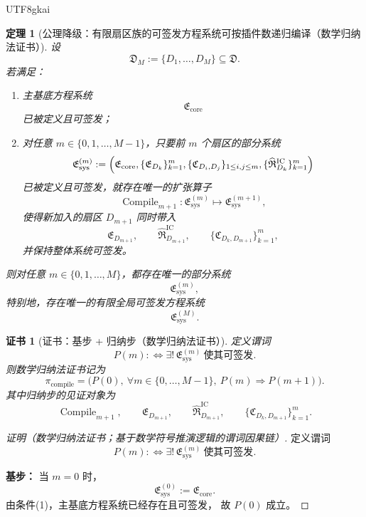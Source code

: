 \documentclass[12pt]{article}
\newtheorem{theorem}{定理}[section]
\newtheorem{Certificate}{证书}[section]
\begin{document}
\begin{CJK*}{UTF8}{gkai}
\begin{theorem}[公理降级：有限扇区族的可签发方程系统可按插件数递归编译（数学归纳法证书）]
\label{thm:tex37-ch11-induction}
设
\[
  \mathfrak D_M
  :=
  \{D_1,\dots,D_M\}
  \subseteq \mathfrak D.
\]
若满足：
\begin{enumerate}
  \item 主基底方程系统
  \[
    \mathfrak E_{\mathrm{core}}
  \]
  已被定义且可签发；
  \item 对任意 $m\in\{0,1,\dots,M-1\}$，只要前 $m$ 个扇区的部分系统
  \[
    \mathfrak E_{\mathrm{sys}}^{(m)}
    :=
    \Bigl(
      \mathfrak E_{\mathrm{core}},
      \{\mathfrak E_{D_k}\}_{k=1}^{m},
      \{\mathfrak C_{D_i,D_j}\}_{1\le i,j\le m},
      \{\widehat{\mathfrak R}_{D_k}^{\mathrm{IC}}\}_{k=1}^{m}
    \Bigr)
  \]
  已被定义且可签发，就存在唯一的扩张算子
  \[
    \operatorname{Compile}_{m+1}:
    \mathfrak E_{\mathrm{sys}}^{(m)}
    \longmapsto
    \mathfrak E_{\mathrm{sys}}^{(m+1)},
  \]
  使得新加入的扇区 $D_{m+1}$ 同时带入
  \[
    \mathfrak E_{D_{m+1}},
    \qquad
    \widehat{\mathfrak R}_{D_{m+1}}^{\mathrm{IC}},
    \qquad
    \{\mathfrak C_{D_k,D_{m+1}}\}_{k=1}^{m},
  \]
  并保持整体系统可签发。
\end{enumerate}
则对任意 $m\in\{0,1,\dots,M\}$，都存在唯一的部分系统
\[
  \mathfrak E_{\mathrm{sys}}^{(m)},
\]
特别地，存在唯一的有限全局可签发方程系统
\[
  \mathfrak E_{\mathrm{sys}}^{(M)}.
\]
\end{theorem}

\begin{Certificate}[证书：基步 + 归纳步（数学归纳法证书）]
\label{cert:tex37-ch11-induction}
定义谓词
\[
  P(m)
  :
  \Longleftrightarrow
  \exists!\,\mathfrak E_{\mathrm{sys}}^{(m)}
  \ \text{使其可签发}.
\]
则数学归纳法证书记为
\[
  \pi_{\mathrm{compile}}
  =
  \bigl(
    P(0),\
    \forall m\in\{0,\dots,M-1\},\ P(m)\Rightarrow P(m+1)
  \bigr).
\]
其中归纳步的见证对象为
\[
  \operatorname{Compile}_{m+1},
  \qquad
  \mathfrak E_{D_{m+1}},
  \qquad
  \widehat{\mathfrak R}_{D_{m+1}}^{\mathrm{IC}},
  \qquad
  \{\mathfrak C_{D_k,D_{m+1}}\}_{k=1}^{m}.
\]
\end{Certificate}

\begin{proof}[证明（数学归纳法证书；基于数学符号推演逻辑的谓词因果链）]
定义谓词
\[
  P(m)
  :
  \Longleftrightarrow
  \exists!\,\mathfrak E_{\mathrm{sys}}^{(m)}
  \ \text{使其可签发}.
\]

\textbf{基步：}
当 $m=0$ 时，
\[
  \mathfrak E_{\mathrm{sys}}^{(0)}:=\mathfrak E_{\mathrm{core}}.
\]
由条件(1)，主基底方程系统已经存在且可签发，
故 $P(0)$ 成立。


\end{proof}
\end{CJK*}
\end{document}
